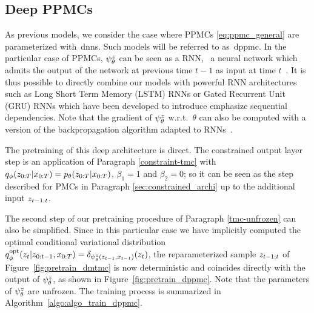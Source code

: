 \tocless\subsection{Deep PPMCs} 
\label{sec:dppmc}
As previous models, we consider the case where
PPMCs \eqref{eq:ppmc_general} are parameterized with~\gls*{dnns}. 
Such models will be
referred to as~\gls*{dppmc}.  
In the 
particular case of PPMCs, 
$\psi^{z}_{\theta}$ can be seen as a RNN, \ie~a neural network
which admits the output of the network at previous
time $t-1$ as input at time $t$~\citep{LSTM}.
It is thus possible to directly combine our models
with powerful RNN architectures such as 
Long Short Term Memory (LSTM) RNNs or
Gated Recurrent Unit (GRU) RNNs which have
been developed to introduce
emphasize sequential dependencies.
Note that the gradient of $\psi^{z}_{\theta}$ w.r.t.~$\theta$
can also be computed with a version of the backpropagation algorithm adapted to
RNNs~\citep{LSTM, GRU}.

The pretraining of this deep architecture
is direct. The constrained output layer step
is an application of Paragraph \ref{constraint-tmc}
with $q_\phi(z_{0:T}|x_{0:T})=p_{\theta}(z_{0:T}|x_{0:T})$, $\beta_1=1$ and $\beta_2=0$; so it can be seen as the step
described for PMCs in Paragraph \ref{sec:constrained_archi} up
to the additional input $z_{t-1:t}$.

The second step of our pretraining procedure of Paragraph \ref{tmc-unfrozen} can also be simplified. Since in this particular case we have implicitly computed  the optimal conditional variational distribution $q_\phi^{\rm opt}(z_t|z_{0:t-1},x_{0:T})=\delta_{\psi^{z}_{\theta}(z_{t-1},x_{t-1})}(z_t)$, the reparameterized sample $z_{t-1:t}$ of Figure~\ref{fig:pretrain_dmtmc}  is now deterministic and coincides directly with the output of $\psi^{z}_{\theta}$, as shown in  Figure~\ref{fig:pretrain_dppmc}. Note that the parameters of $\psi^{z}_{\theta}$ are unfrozen.
The training process is summarized in Algorithm~\ref{algo:algo_train_dppmc}.


